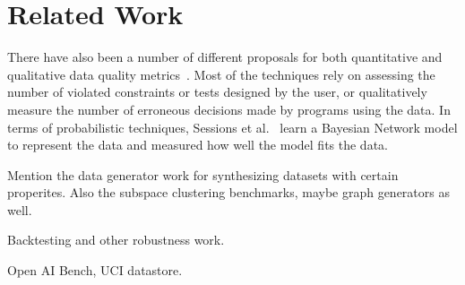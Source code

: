 \section{Related Work}
There have also been a number of different proposals for both quantitative and qualitative data quality metrics~\cite{DBLP:journals/cacm/PipinoLW02, DBLP:journals/jdiq/CheahP15, DBLP:journals/jdiq/EvenS09,DBLP:journals/jdiq/SessionsV09, DBLP:journals/tkde/FanGLX11,DBLP:journals/sigmetrics/KeetonMW09}.
Most of the techniques rely on assessing the number of violated constraints or tests designed by the user, or qualitatively measure the number of erroneous decisions made by programs using the data.
In terms of probabilistic techniques, Sessions et al.~\cite{DBLP:journals/jdiq/SessionsV09} learn a Bayesian Network model to represent the data and measured how well the model fits the data.


Mention the data generator work  for synthesizing datasets with certain properites.   Also the subspace clustering benchmarks, maybe graph generators as well.


Backtesting and other robustness work.

Open AI Bench, UCI datastore.
